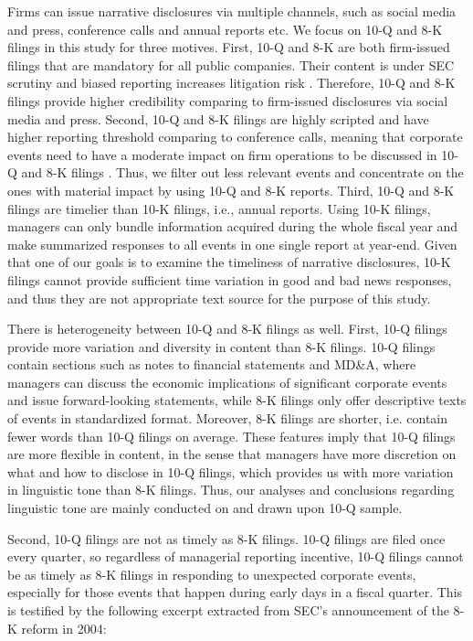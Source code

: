 \documentclass[a4paper]{article}
\begin{document}
\begin{spacing}{2}
Firms can issue narrative disclosures via multiple channels, such as social media and press, conference calls and annual reports etc. We focus on 10-Q and 8-K filings in this study for three motives. First, 10-Q and 8-K are both firm-issued filings that are mandatory for all public companies. Their content is under SEC scrutiny and biased reporting increases litigation risk . Therefore, 10-Q and 8-K filings provide higher credibility comparing to firm-issued disclosures via social media and press. Second, 10-Q and 8-K filings are highly scripted and have higher reporting threshold comparing to conference calls, meaning that corporate events need to have a moderate impact on firm operations to be discussed in 10-Q and 8-K filings . Thus, we filter out less relevant events and concentrate on the ones with material impact by using 10-Q and 8-K reports. Third, 10-Q and 8-K filings are timelier than 10-K filings, i.e., annual reports. Using 10-K filings, managers can only bundle information acquired during the whole fiscal year and make summarized responses to all events in one single report at year-end. Given that one of our goals is to examine the timeliness of narrative disclosures, 10-K filings cannot provide sufficient time variation in good and bad news responses, and thus they are not appropriate text source for the purpose of this study.

There is heterogeneity between 10-Q and 8-K filings as well. First, 10-Q filings provide more variation and diversity in content than 8-K filings. 10-Q filings contain sections such as notes to financial statements and MD\&A, where managers can discuss the economic implications of significant corporate events and issue forward-looking statements, while 8-K filings only offer descriptive texts of events in standardized format. Moreover, 8-K filings are shorter, i.e. contain fewer words than 10-Q filings on average. These features imply that 10-Q filings are more flexible in content, in the sense that managers have more discretion on what and how to disclose in 10-Q filings, which provides us with more variation in linguistic tone than 8-K filings. Thus, our analyses and conclusions regarding linguistic tone are mainly conducted on and drawn upon 10-Q sample. 

Second, 10-Q filings are not as timely as 8-K filings. 10-Q filings are filed once every quarter, so regardless of managerial reporting incentive, 10-Q filings cannot be as timely as 8-K filings in responding to unexpected corporate events, especially for those events that happen during early days in a fiscal quarter. This is testified by the following excerpt extracted from SEC's announcement of the 8-K reform in 2004:


\end{spacing}
\end{document}
